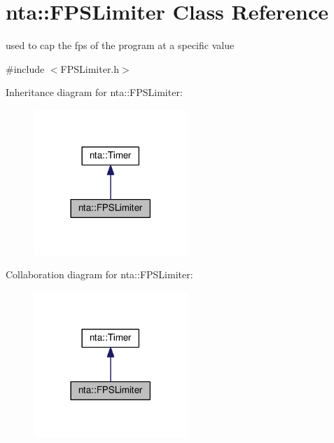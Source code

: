 \hypertarget{classnta_1_1FPSLimiter}{}\section{nta\+:\+:F\+P\+S\+Limiter Class Reference}
\label{classnta_1_1FPSLimiter}


used to cap the fps of the program at a specific value  




{\ttfamily \#include $<$F\+P\+S\+Limiter.\+h$>$}



Inheritance diagram for nta\+:\+:F\+P\+S\+Limiter\+:
\nopagebreak
\begin{figure}[H]
\begin{center}
\leavevmode
\includegraphics[width=165pt]{de/d03/classnta_1_1FPSLimiter__inherit__graph}
\end{center}
\end{figure}


Collaboration diagram for nta\+:\+:F\+P\+S\+Limiter\+:
\nopagebreak
\begin{figure}[H]
\begin{center}
\leavevmode
\includegraphics[width=165pt]{de/da2/classnta_1_1FPSLimiter__coll__graph}
\end{center}
\end{figure}
